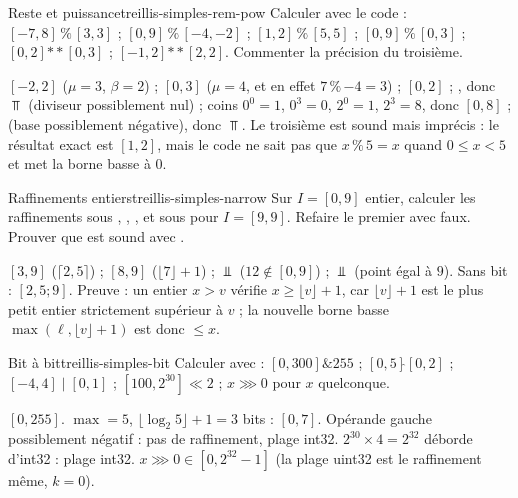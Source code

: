 \begin{exercice}{Reste et puissance}{treillis-simples-rem-pow}
  Calculer avec le code : $[-7,8] \mathbin{\%} [3,3]$ ;
  $[0,9] \mathbin{\%} [-4,-2]$ ; $[1,2] \mathbin{\%} [5,5]$ ;
  $[0,9] \mathbin{\%} [0,3]$ ; $[0,2] \mathbin{**} [0,3]$ ;
  $[-1,2] \mathbin{**} [2,2]$. Commenter la précision du troisième.
\end{exercice}
\begin{solution}
  $[-2,2]$ ($\mu = 3$, $\beta = 2$) ; $[0,3]$ ($\mu = 4$, et en effet
  $7 \mathbin{\%} -4 = 3$) ; $[0,2]$ ; , donc $\Top$ (diviseur
  possiblement nul) ; coins $0^0 = 1$, $0^3 = 0$, $2^0 = 1$, $2^3 = 8$,
  donc $[0,8]$ ;  (base possiblement négative), donc $\Top$. Le
  troisième est sound mais imprécis : le résultat exact est $[1,2]$, mais le
  code ne sait pas que $x \mathbin{\%} 5 = x$ quand $0 \le x < 5$ et met la
  borne basse à $0$.
\end{solution}

\begin{exercice}{Raffinements entiers}{treillis-simples-narrow}
  Sur $I = [0,9]$ entier, calculer les raffinements sous ,
  , , et sous  pour $I = [9,9]$.
  Refaire le premier avec  faux. Prouver que
   est sound avec .
\end{exercice}
\begin{solution}
  $[3,9]$ ($\lceil 2{,}5 \rceil$) ; $[8,9]$ ($\lfloor 7 \rfloor + 1$) ;
  $\Bot$ ($12 \notin [0,9]$) ; $\Bot$ (point égal à $9$). Sans bit :
  $[2{,}5; 9]$. Preuve : un entier $x > v$ vérifie
  $x \ge \lfloor v \rfloor + 1$, car $\lfloor v \rfloor + 1$ est le plus petit
  entier strictement supérieur à $v$ ; la nouvelle borne basse
  $\max(\ell, \lfloor v \rfloor + 1)$ est donc $\le x$.
\end{solution}

\begin{exercice}{Bit à bit}{treillis-simples-bit}
  Calculer avec  : $[0,300] \mathbin{\&} 255$ ;
  $[0,5] \mathbin{\hat{}} [0,2]$ ; $[-4,4] \mathbin{|} [0,1]$ ;
  $[100, 2^{30}] \ll 2$ ; $x \ggg 0$ pour $x$ quelconque.
\end{exercice}
\begin{solution}
  $[0,255]$. $\max = 5$, $\lfloor\log_2 5\rfloor + 1 = 3$ bits : $[0,7]$.
  Opérande gauche possiblement négatif : pas de raffinement, plage int32.
  $2^{30} \times 4 = 2^{32}$ déborde d'int32 : plage int32. $x \ggg 0 \in
  [0, 2^{32} - 1]$ (la plage uint32 est le raffinement même, $k = 0$).
\end{solution}


